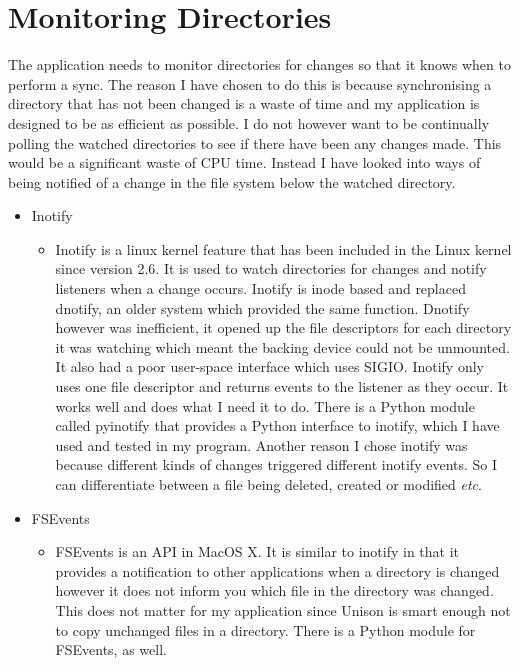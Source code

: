 \documentclass[12pt]{article}
\begin{document}
\section{Monitoring Directories}
The application needs to monitor directories for changes
so that it knows when to perform a sync. The reason I have
chosen to do this is because synchronising a directory that
has not been changed is a waste of time and my application
is designed to be as efficient as possible. I do not
however want to be continually polling the watched
directories to see if there have been any changes made.
This would be a significant waste of CPU time. Instead
I have looked into ways of being notified of a
change in the file system below the watched directory.
\begin{itemize}
    \item Inotify
        \begin{itemize}
        \item Inotify is a linux kernel feature that has been
        included in the Linux kernel since version 2.6.
        It is used to watch directories for changes
        and notify listeners when a change occurs. Inotify
        is inode based and replaced dnotify, an older system
        which provided the same function. Dnotify however was
        inefficient, it opened up the file descriptors for
        each directory it was watching which meant the backing
        device could not be unmounted. 
        It also had a poor
        user-space interface which uses SIGIO. Inotify only
        uses one file descriptor and returns events to the
        listener as they occur\cite{inotify-readme}. It works well and does
        what I need it to do. There is a Python module
        called pyinotify that provides a Python interface
        to inotify, which I have used and tested in my program.
        Another reason I chose inotify was because different kinds
        of changes triggered different inotify events. So I
        can differentiate between a file being deleted, created
        or modified \emph{etc}.
        \end{itemize}

    \item FSEvents
        \begin{itemize}
        \item FSEvents is an API in MacOS X\cite{fsevents-intro}. It is similar
        to inotify in that it provides a notification to other
        applications when a directory is changed however
        it does not inform you which file in the directory
        was changed. This does not matter for my
        application since Unison is smart enough not to copy
        unchanged files in a directory. There is a Python module
        for FSEvents, as well. 
        

\end{itemize}
\end{itemize}
\end{document}
